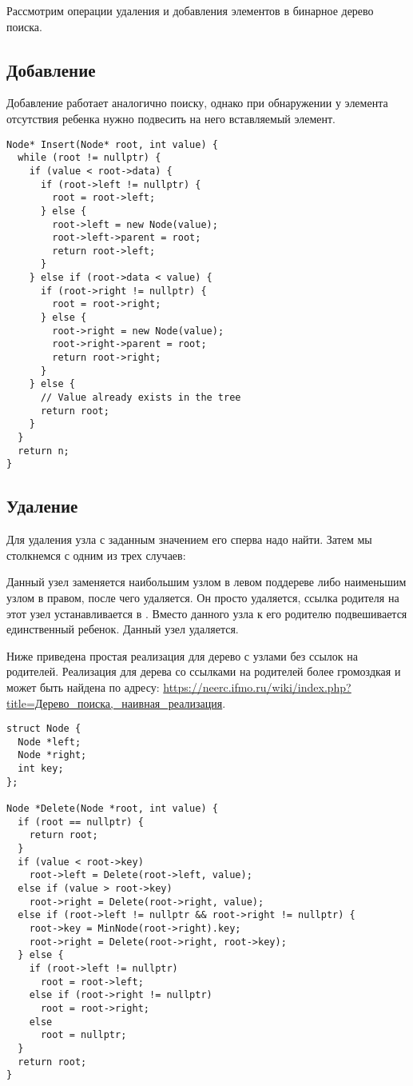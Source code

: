 Рассмотрим операции удаления и добавления элементов в бинарное дерево поиска.
\subsection{Добавление}
Добавление работает аналогично поиску, однако при обнаружении у элемента отсутствия ребенка
нужно подвесить на него вставляемый элемент.
\begin{verbatim}
Node* Insert(Node* root, int value) {
  while (root != nullptr) {
    if (value < root->data) {
      if (root->left != nullptr) {
        root = root->left;
      } else {
        root->left = new Node(value);
        root->left->parent = root;
        return root->left;
      }
    } else if (root->data < value) {
      if (root->right != nullptr) {
        root = root->right;
      } else {
        root->right = new Node(value);
        root->right->parent = root;
        return root->right;
      }
    } else {
      // Value already exists in the tree
      return root;
    }
  }
  return n;
}
\end{verbatim}
\subsection{Удаление}
Для удаления узла с заданным значением его сперва надо найти. Затем мы столкнемся с одним из трех случаев:
\begin{enumerate}
   Данный узел заменяется наибольшим узлом в левом поддереве либо наименьшим узлом в правом, после чего удаляется.
   Он просто удаляется, ссылка родителя на этот узел устанавливается в .
   Вместо данного узла к его родителю подвешивается единственный ребенок. Данный узел удаляется.
\end{enumerate}
Ниже приведена простая реализация для дерево с узлами без ссылок на родителей. Реализация для дерева
со ссылками на родителей более громоздкая и может быть найдена по адресу:
\url{https://neerc.ifmo.ru/wiki/index.php?title=Дерево_поиска,_наивная_реализация}.
\begin{verbatim}
struct Node {
  Node *left;
  Node *right;
  int key;
};

Node *Delete(Node *root, int value) {
  if (root == nullptr) {
    return root;
  }
  if (value < root->key)
    root->left = Delete(root->left, value);
  else if (value > root->key)
    root->right = Delete(root->right, value);
  else if (root->left != nullptr && root->right != nullptr) {
    root->key = MinNode(root->right).key;
    root->right = Delete(root->right, root->key);
  } else {
    if (root->left != nullptr)
      root = root->left;
    else if (root->right != nullptr)
      root = root->right;
    else
      root = nullptr;
  }
  return root;
}
\end{verbatim}